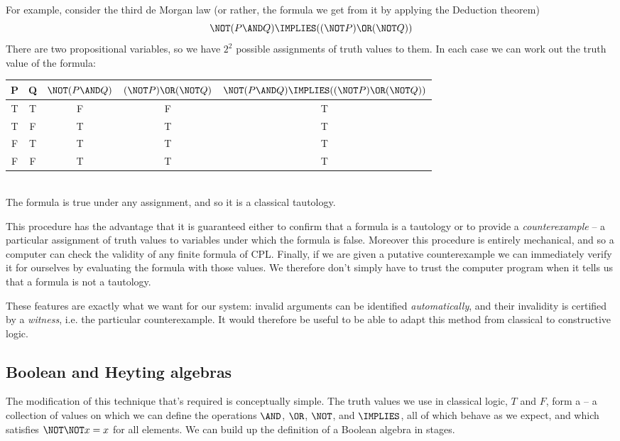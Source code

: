 For example, consider the third de Morgan law (or rather, the formula we get from it by applying the Deduction theorem)
\[
\NOT (P \AND Q) \IMPLIES ((\NOT P) \OR (\NOT Q))
\]
There are two propositional variables, so we have $2^2$ possible assignments of truth values to them.  In each case we can work out the truth value of the formula:\\
\begin{table}[h]
\centering
\begin{tabular}{c c|c c c}
P &	Q & $\NOT(P \AND Q)$ &	$(\NOT P) \OR (\NOT Q)$ &	$\NOT (P \AND Q) \IMPLIES ((\NOT P) \OR (\NOT Q))$ \\
\hline
T & T & F & F & T\\
T & F & T & T & T\\
F & T & T & T & T\\
F & F & T & T & T\\
\end{tabular}
\end{table}\\
The formula is true under any assignment, and so it is a classical tautology.

This procedure has the advantage that it is guaranteed either to  confirm that a formula is a tautology or to provide a \emph{counterexample} -- a particular assignment of truth values to variables under which the formula is false.  Moreover this procedure is entirely mechanical, and so a computer can check the validity of any finite formula of CPL.  Finally, if we are given a putative counterexample we can immediately verify it for ourselves by evaluating the formula with those values.  We therefore don't simply have to trust the computer program when it tells us that a formula is not a tautology.

These features are exactly what we want for our system: invalid arguments can be identified \emph{automatically}, and their invalidity is certified by a \emph{witness}, i.e. the particular counterexample.  It would therefore be useful to be able to adapt this method from classical to constructive logic.


\subsection{Boolean and Heyting algebras}

The modification of this technique that's required is conceptually simple.  The truth values we use in classical logic, $T$ and $F$, form a  -- a collection of values on which we can define the operations $\AND$, $\OR$, $\NOT$, and $\IMPLIES$, all of which behave as we expect, and which satisfies $\NOT \NOT x = x$ for all elements.  We can build up the definition of a Boolean algebra in stages.  

